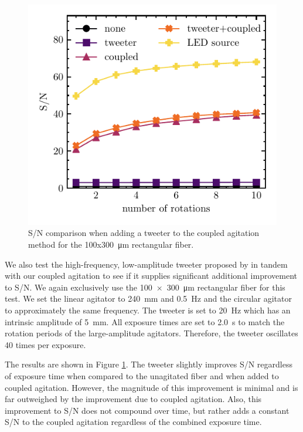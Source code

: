 \documentclass[twocolumn]{emulateapj}
\begin{document}
\begin{figure}
\centering
	\includegraphics[width=\columnwidth]{tweeter_snr.pdf}
	\caption{S/N comparison when adding a tweeter to the coupled agitation method for the 100x\SI{300}{\micro\meter} rectangular fiber.}
\label{fig:tweeter_snr}
\end{figure}

We also test the high-frequency, low-amplitude tweeter proposed by \citet{Plavchan2013} in tandem with our coupled agitation to see if it supplies significant additional improvement to S/N. We again exclusively use the \SI{100x300}{\micro\meter} rectangular fiber for this test. We set the linear agitator to \SI{240}{\milli\meter} and \SI{0.5}{\hertz} and the circular agitator to approximately the same frequency. The tweeter is set to \SI{20}{\hertz} which has an intrinsic amplitude of \SI{5}{\milli\meter}. All exposure times are set to \SI{2.0}{\second} to match the rotation periods of the large-amplitude agitators. Therefore, the tweeter oscillates 40 times per exposure.

The results are shown in Figure \ref{fig:tweeter_snr}. The tweeter slightly improves S/N regardless of exposure time when compared to the unagitated fiber and when added to coupled agitation. However, the magnitude of this improvement is minimal and is far outweighed by the improvement due to coupled agitation. Also, this improvement to S/N does not compound over time, but rather adds a constant S/N to the coupled agitation regardless of the combined exposure time.
\end{document}
